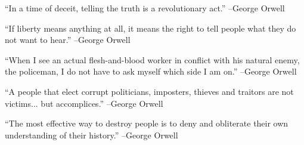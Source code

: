\documentclass{article}%
\begin{document}
\linebreak%
\vspace{1mm}%
\begin{minipage}{\textwidth}%
\flushleft%
“In a time of deceit, telling the truth is a revolutionary act.”%
\linebreak%
\vspace{1mm}%
–George Orwell%
\linebreak%
\vspace{1mm}%
\end{minipage}%
\linebreak%
\vspace{1mm}%
\begin{minipage}{\textwidth}%
\flushleft%
“If liberty means anything at all, it means the right to tell people what they do not want to hear.”%
\linebreak%
\vspace{1mm}%
–George Orwell%
\linebreak%
\vspace{1mm}%
\end{minipage}%
\linebreak%
\vspace{1mm}%
\begin{minipage}{\textwidth}%
\flushleft%
“When I see an actual flesh{-}and{-}blood worker in conflict with his natural enemy, the policeman, I do not have to ask myself which side I am on.”%
\linebreak%
\vspace{1mm}%
–George Orwell%
\linebreak%
\vspace{1mm}%
\end{minipage}%
\linebreak%
\vspace{1mm}%
\begin{minipage}{\textwidth}%
\flushleft%
“A people that elect corrupt politicians, imposters, thieves and traitors are not victims... but accomplices.”%
\linebreak%
\vspace{1mm}%
–George Orwell%
\linebreak%
\vspace{1mm}%
\end{minipage}%
\linebreak%
\vspace{1mm}%
\begin{minipage}{\textwidth}%
\flushleft%
“The most effective way to destroy people is to deny and obliterate their own understanding of their history.”%
\linebreak%
\vspace{1mm}%
–George Orwell%
\linebreak%
\vspace{1mm}%
\end{minipage}%
\end{document}
